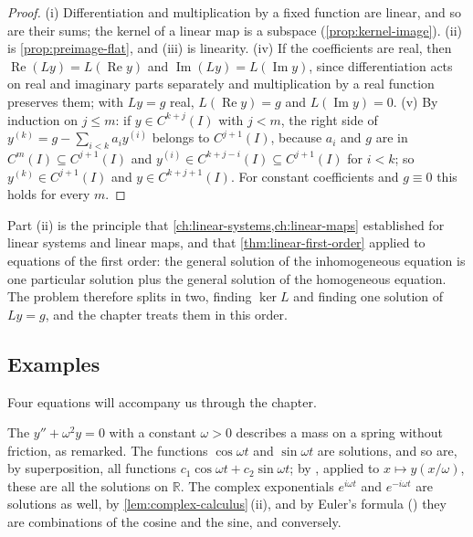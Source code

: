\begin{proof}
(i) Differentiation and multiplication by a fixed function are linear, and so are their sums; the kernel of a linear map is a subspace (\cref{prop:kernel-image}). (ii) is \cref{prop:preimage-flat}, and (iii) is linearity. (iv) If the coefficients are real, then $\operatorname{Re}(Ly)=L(\operatorname{Re}y)$ and $\operatorname{Im}(Ly)=L(\operatorname{Im}y)$, since differentiation acts on real and imaginary parts separately and multiplication by a real function preserves them; with $Ly=g$ real, $L(\operatorname{Re}y)=g$ and $L(\operatorname{Im}y)=0$. (v) By induction on $j\le m$: if $y\in C^{k+j}(I)$ with $j<m$, the right side of $y^{(k)}=g-\sum_{i<k}a_iy^{(i)}$ belongs to $C^{j+1}(I)$, because $a_i$ and $g$ are in $C^m(I)\subseteq C^{j+1}(I)$ and $y^{(i)}\in C^{k+j-i}(I)\subseteq C^{j+1}(I)$ for $i<k$; so $y^{(k)}\in C^{j+1}(I)$ and $y\in C^{k+j+1}(I)$. For constant coefficients and $g\equiv0$ this holds for every $m$.
\end{proof}

Part (ii) is the principle that \cref{ch:linear-systems,ch:linear-maps} established for linear systems and linear maps, and that \cref{thm:linear-first-order} applied to equations of the first order: the general solution of the inhomogeneous equation is one particular solution plus the general solution of the homogeneous equation. The problem therefore splits in two, finding $\ker L$ and finding one solution of $Ly=g$, and the chapter treats them in this order.

\subsection{Examples}

Four equations will accompany us through the chapter.

The  $y''+\omega^2y=0$ with a constant $\omega>0$ describes a mass on a spring without friction, as  remarked. The functions $\cos\omega t$ and $\sin\omega t$ are solutions, and so are, by superposition, all functions $c_1\cos\omega t+c_2\sin\omega t$; by , applied to $x\mapsto y(x/\omega)$, these are all the solutions on $\mathbb R$. The complex exponentials $e^{i\omega t}$ and $e^{-i\omega t}$ are solutions as well, by \cref{lem:complex-calculus}\,(ii), and by Euler's formula () they are combinations of the cosine and the sine, and conversely.

